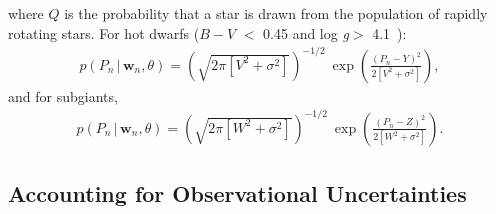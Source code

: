 \documentclass[11pt,preprint]{aastex}
\newcommand{\logg}{log \emph{g}}
\newcommand{\w}{\mathbf{w}}
\newcommand{\subcut}{4.1~}
\begin{document}
where $Q$ is the probability that a star is drawn from the population of rapidly rotating stars.
For hot dwarfs ($B-V$ $<$ 0.45 and \logg $>$ \subcut):
\begin{eqnarray}
p(P_n\,|\,\w_n,\theta) = \left(\sqrt{2\pi[V^2+\sigma^2]}\right)^{-1/2}~\exp\left({\frac{(P_n-Y)^2}{2[V^2+\sigma^2]}}\right),
\end{eqnarray}
and for subgiants,
\begin{eqnarray}
p(P_n\,|\,\w_n,\theta) = \left(\sqrt{2\pi[W^2+\sigma^2]}\right)^{-1/2}~\exp\left({\frac{(P_n-Z)^2}{2[W^2+\sigma^2]}}\right).
\end{eqnarray}

\subsection{Accounting for Observational Uncertainties}
\end{document}
